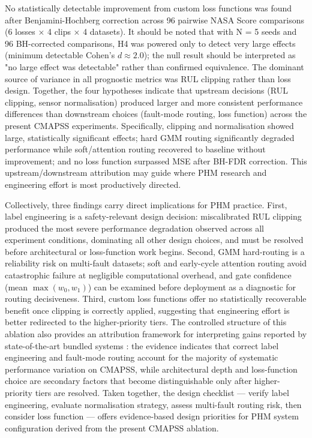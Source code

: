 \documentclass[preprint,10pt]{elsarticle}
\begin{document}
No statistically detectable improvement from custom loss functions was found after Benjamini-Hochberg correction across 96 pairwise NASA Score comparisons (6 losses × 4 clips × 4 datasets). It should be noted that with N = 5 seeds and 96 BH-corrected comparisons, H4 was powered only to detect very large effects (minimum detectable Cohen's $d \approx 2.0$); the null result should be interpreted as "no large effect was detectable" rather than confirmed equivalence. The dominant source of variance in all prognostic metrics was RUL clipping rather than loss design. Together, the four hypotheses indicate that upstream decisions (RUL clipping, sensor normalisation) produced larger and more consistent performance differences than downstream choices (fault-mode routing, loss function) across the present CMAPSS experiments. Specifically, clipping and normalisation showed large, statistically significant effects; hard GMM routing significantly degraded performance while soft/attention routing recovered to baseline without improvement; and no loss function surpassed MSE after BH-FDR correction. This upstream/downstream attribution may guide where PHM research and engineering effort is most productively directed.

Collectively, three findings carry direct implications for PHM practice. First, label engineering is a safety-relevant design decision: miscalibrated RUL clipping produced the most severe performance degradation observed across all experiment conditions, dominating all other design choices, and must be resolved before architectural or loss-function work begins. Second, GMM hard-routing is a reliability risk on multi-fault datasets; soft and early-cycle attention routing avoid catastrophic failure at negligible computational overhead, and gate confidence (mean $\max(w_0, w_1)$) can be examined before deployment as a diagnostic for routing decisiveness. Third, custom loss functions offer no statistically recoverable benefit once clipping is correctly applied, suggesting that engineering effort is better redirected to the higher-priority tiers. The controlled structure of this ablation also provides an attribution framework for interpreting gains reported by state-of-the-art bundled systems \cite{ref14,ref29,ref42}: the evidence indicates that correct label engineering and fault-mode routing account for the majority of systematic performance variation on CMAPSS, while architectural depth and loss-function choice are secondary factors that become distinguishable only after higher-priority tiers are resolved. Taken together, the design checklist — verify label engineering, evaluate normalisation strategy, assess multi-fault routing risk, then consider loss function — offers evidence-based design priorities for PHM system configuration derived from the present CMAPSS ablation.
\end{document}
